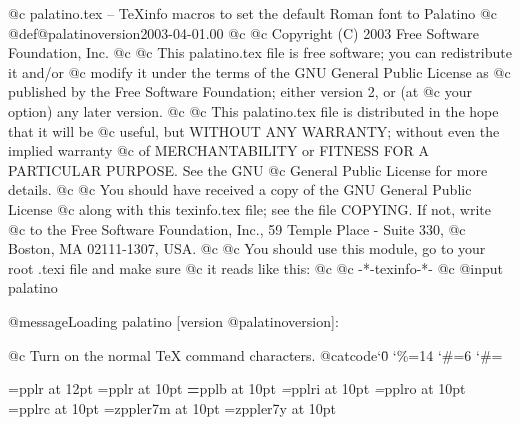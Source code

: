 @c palatino.tex -- TeXinfo macros to set the default Roman font to Palatino
@c
@def@palatinoversion{2003-04-01.00}
@c
@c Copyright (C) 2003  Free Software Foundation, Inc.
@c
@c This palatino.tex file is free software; you can redistribute it and/or
@c modify it under the terms of the GNU General Public License as
@c published by the Free Software Foundation; either version 2, or (at
@c your option) any later version.
@c
@c This palatino.tex file is distributed in the hope that it will be
@c useful, but WITHOUT ANY WARRANTY; without even the implied warranty
@c of MERCHANTABILITY or FITNESS FOR A PARTICULAR PURPOSE.  See the GNU
@c General Public License for more details.
@c
@c You should have received a copy of the GNU General Public License
@c along with this texinfo.tex file; see the file COPYING.  If not, write
@c to the Free Software Foundation, Inc., 59 Temple Place - Suite 330,
@c Boston, MA 02111-1307, USA.
@c
@c You should use this module, go to your root .texi file and make sure
@c it reads like this:
@c       @c -*-texinfo-*-
@c     @input palatino

@message{Loading palatino [version @palatinoversion]:}

@c Turn on the normal TeX command characters.
@catcode`\=0
\catcode`\%=14
\catcode`\#=6
\let\setfontorig=\setfont
\def\setfont#1#2#3#4{\font#1=#2#3 at #4}
\catcode`\#=\other

\def\rmfontprefix{ppl}

\def\rmshape{r}
\def\rmbshape{b}
\def\bfshape{b}
\def\bxshape{b}
\def\itshape{ri}
\def\itbshape{bi}
\def\slshape{ro}
\def\slbshape{bo}
\def\scshape{rc}
\def\scbshape{bc}

\ifx\bigger\relax
  \def\mainmagstep{12pt}
  \setfont\textrm\rmfontprefix\rmshape{\mainmagstep}
\else
  \def\mainmagstep{10pt}
  \setfont\textrm\rmfontprefix\rmshape{\mainmagstep}
\fi
\setfont\textbf\rmfontprefix\bfshape{\mainmagstep}
\setfont\textit\rmfontprefix\itshape{\mainmagstep}
\setfont\textsl\rmfontprefix\slshape{\mainmagstep}
\setfont\textsc\rmfontprefix\scshape{\mainmagstep}
\font\texti=zppler7m at \mainmagstep
\font\textsy=zppler7y at \mainmagstep

